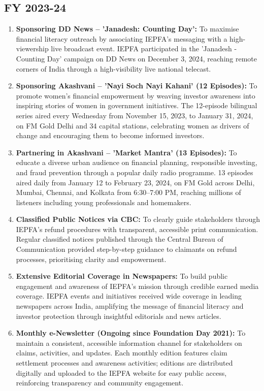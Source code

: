 \documentclass[openany]{book}
\begin{document}
\subsection{FY 2023-24}
\begin{enumerate}
    \item \textbf{Sponsoring DD News – 'Janadesh: Counting Day':} To maximise financial literacy outreach by associating IEPFA's messaging with a high-viewership live broadcast event. IEPFA participated in the 'Janadesh - Counting Day' campaign on DD News on December 3, 2024, reaching remote corners of India through a high-visibility live national telecast.
    \item \textbf{Sponsoring Akashvani – 'Nayi Soch Nayi Kahani' (12 Episodes):} To promote women's financial empowerment by weaving investor awareness into inspiring stories of women in government initiatives. The 12-episode bilingual series aired every Wednesday from November 15, 2023, to January 31, 2024, on FM Gold Delhi and 34 capital stations, celebrating women as drivers of change and encouraging them to become informed investors.
    \item \textbf{Partnering in Akashvani – 'Market Mantra' (13 Episodes):} To educate a diverse urban audience on financial planning, responsible investing, and fraud prevention through a popular daily radio programme. 13 episodes aired daily from January 12 to February 23, 2024, on FM Gold across Delhi, Mumbai, Chennai, and Kolkata from 6:30–7:00 PM, reaching millions of listeners including young professionals and homemakers.
    \item \textbf{Classified Public Notices via CBC:} To clearly guide stakeholders through IEPFA's refund procedures with transparent, accessible print communication. Regular classified notices published through the Central Bureau of Communication provided step-by-step guidance to claimants on refund processes, prioritising clarity and empowerment.
    \item \textbf{Extensive Editorial Coverage in Newspapers:} To build public engagement and awareness of IEPFA's mission through credible earned media coverage. IEPFA events and initiatives received wide coverage in leading newspapers across India, amplifying the message of financial literacy and investor protection through insightful editorials and news articles.
    \item \textbf{Monthly e-Newsletter (Ongoing since Foundation Day 2021):} To maintain a consistent, accessible information channel for stakeholders on claims, activities, and updates. Each monthly edition features claim settlement processes and awareness activities; editions are distributed digitally and uploaded to the IEPFA website for easy public access, reinforcing transparency and community engagement.
\end{enumerate}
\end{document}
